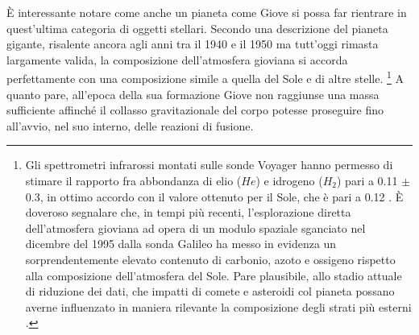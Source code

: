 \`E interessante notare come anche un pianeta come Giove si possa far rientrare in quest'ultima categoria di oggetti stellari. Secondo una descrizione del pianeta gigante, risalente ancora agli anni tra il 1940 e il 1950 ma tutt'oggi rimasta largamente valida, la composizione dell'atmosfera gioviana si accorda perfettamente con una composizione simile a quella del Sole e di altre stelle. \footnote{Gli spettrometri infrarossi montati sulle sonde Voyager hanno permesso di stimare il rapporto fra abbondanza di elio ($He$) e idrogeno ($H_{2}$) pari a 0.11 $\pm$ 0.3, in ottimo accordo con il valore ottenuto per il Sole, che è pari a 0.12 \Cite{cav}. \`E doveroso segnalare che, in tempi più recenti, l'esplorazione  diretta dell'atmosfera gioviana ad opera di un modulo spaziale sganciato nel dicembre del 1995 dalla sonda Galileo ha messo in evidenza un sorprendentemente elevato contenuto di carbonio, azoto e ossigeno rispetto alla composizione dell'atmosfera del Sole. Pare plausibile, allo stadio attuale di riduzione dei dati, che impatti di comete e asteroidi col pianeta possano averne influenzato in maniera rilevante la composizione degli strati più esterni \Cite{conti}.}
A quanto pare, all'epoca della sua formazione Giove non raggiunse una massa sufficiente affinché il collasso gravitazionale del corpo potesse proseguire fino all'avvio, nel suo interno, delle reazioni di fusione. 
